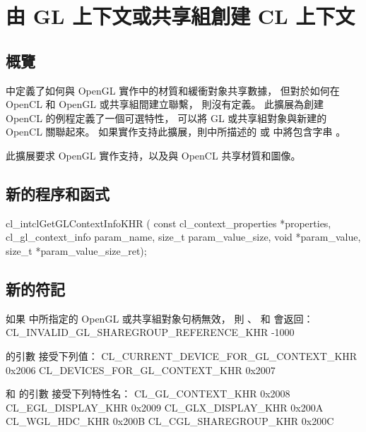 \section{由 GL 上下文或共享組創建 CL 上下文}

\subsection{概覽}

中定義了如何與 OpenGL 實作中的材質和緩衝對象共享數據，
但對於如何在 OpenCL 和 OpenGL 或共享組間建立聯繫，
則沒有定義。
此擴展為創建 OpenCL 的例程定義了一個可選特性，
可以將 GL 或共享組對象與新建的 OpenCL 關聯起來。
如果實作支持此擴展，則中所描述的  或
 中將包含字串 。

此擴展要求 OpenGL 實作支持，以及與 OpenCL 共享材質和圖像。

\subsection{新的程序和函式}


\startclc
cl_intclGetGLContextInfoKHR (
		const cl_context_properties *properties,
		cl_gl_context_info param_name,
		size_t param_value_size,
		void *param_value,
		size_t *param_value_size_ret);
\stopclc

\subsection{新的符記}

如果  中所指定的 OpenGL 或共享組對象句柄無效，
則 、  和  會返回：
\startclc
CL_INVALID_GL_SHAREGROUP_REFERENCE_KHR		-1000
\stopclc

 的引數  接受下列值：
\startclc
CL_CURRENT_DEVICE_FOR_GL_CONTEXT_KHR		0x2006
CL_DEVICES_FOR_GL_CONTEXT_KHR			0x2007
\stopclc

 和  的引數  接受下列特性名：
\startclc
CL_GL_CONTEXT_KHR	0x2008
CL_EGL_DISPLAY_KHR	0x2009
CL_GLX_DISPLAY_KHR	0x200A
CL_WGL_HDC_KHR		0x200B
CL_CGL_SHAREGROUP_KHR	0x200C
\stopclc

